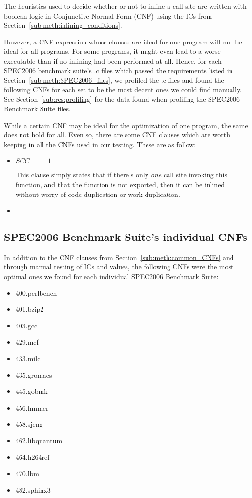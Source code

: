 The heuristics used to decide whether or not to inline a call site are written
with boolean logic in Conjunctive Normal Form (CNF) using the ICs from
Section~\ref{sub:meth:inlining_conditions}.

However, a CNF expression whose clauses are ideal for one program will not be
ideal for all programs. For some programs, it might even lead to a worse
executable than if no inlining had been performed at all. Hence, for each
SPEC2006 benchmark suite's .c files which passed the requirements listed in
Section~\ref{sub:meth:SPEC2006_files}, we profiled the .c files and found the
following CNFs for each set to be the most decent ones we could find manually.
See Section~\ref{sub:res:profiling} for the data found when profiling the
SPEC2006 Benchmark Suite files.

While a certain CNF may be ideal for the optimization of one program, the same
does not hold for all. Even so, there are some CNF clauses which are worth
keeping in all the CNFs used in our testing. These are as follow:

\begin{itemize}
	\item $SCC == 1$

This clause simply states that if there's only \textit{one} call site invoking
this function, and that the function is not exported, then it can be inlined
without worry of code duplication or work duplication.

	\item {}
\end{itemize}

\subsection{SPEC2006 Benchmark Suite's individual CNFs}
\label{sub:meth:SPEC2006_heuristics}

In addition to the CNF clauses from Section~\ref{sub:meth:common_CNFs} and
through manual testing of ICs and values, the following CNFs were the most
optimal ones we found for each individual SPEC2006 Benchmark Suite:

\begin{multicols}{2}
	\begin{itemize}
		\item 400.perlbench
		\item 401.bzip2
		\item 403.gcc
		\item 429.mcf
		\item 433.milc
		\item 435.gromacs
		\item 445.gobmk
		\item 456.hmmer
		\item 458.sjeng
		\item 462.libquantum
		\item 464.h264ref
		\item 470.lbm
		\item 482.sphinx3
	\end{itemize}
\end{multicols}

